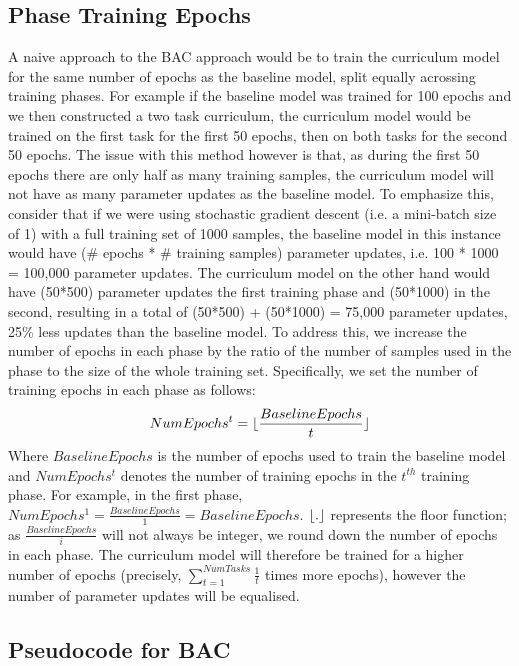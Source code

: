 \subsection{Phase Training Epochs}
A naive approach to the BAC approach would be to train the curriculum model for the same number of epochs as the baseline model, split equally acrossing training phases. For example if the baseline model was trained for 100 epochs and we then constructed a two task curriculum, the curriculum model would be trained on the first task for the first 50 epochs, then on both tasks for the second 50 epochs. The issue with this method however is that, as during the first 50 epochs there are only half as many training samples, the curriculum model will not have as many parameter updates as the baseline model. To emphasize this, consider that if we were using stochastic gradient descent (i.e. a mini-batch size of 1) with a full training set of 1000 samples, the baseline model in this instance would have (\# epochs * \# training samples) parameter updates, i.e. 100 * 1000 = 100,000 parameter updates. The curriculum model on the other hand would have (50*500) parameter updates the first training phase and (50*1000) in the second, resulting in a total of   (50*500) + (50*1000) = 75,000 parameter updates, 25\% less updates than the baseline model. To address this, we increase the number of epochs in each phase by the ratio of the number of samples used in the phase to the size of the whole training set. Specifically, we set the number of training epochs in each phase as follows:
\begin{equation}\label{eq:BAC_Epochs}
NumEpochs^{t} =\lfloor \frac{BaselineEpochs}{t}\rfloor
\end{equation}
Where $BaselineEpochs$ is the number of epochs used to train the baseline model and $NumEpochs^{t}$ denotes the number of training epochs in the $t^{th}$ training phase. For example, in the first phase, $NumEpochs^{1} = \frac{BaselineEpochs}{1} = BaselineEpochs$. $\lfloor.\rfloor$ represents the floor function; as $\frac{BaselineEpochs}{i}$ will not always be integer, we round down the number of epochs in each phase. The curriculum model will therefore be trained for a higher number of epochs (precisely, $\sum_{t=1}^{NumTasks}{\frac{1}{t}}$ times more epochs), however the number of parameter updates will be equalised. 

\subsection{Pseudocode for BAC}\label{BACPseudocode}

